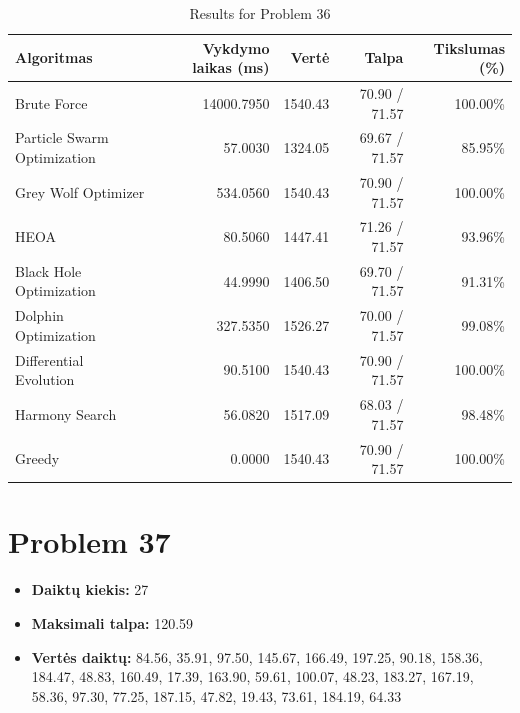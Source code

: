 \documentclass[a4paper,11pt]{article}
\begin{document}
\begin{table}[h!]
\centering
\begin{tabular}{lrrrr}
\toprule
\textbf{Algoritmas} & \textbf{Vykdymo laikas (ms)} & \textbf{Vertė} & \textbf{Talpa} & \textbf{Tikslumas (\%)} \\
\midrule
Brute Force & 14000.7950 & 1540.43 & 70.90 / 71.57 & 100.00\% \\
Particle Swarm Optimization & 57.0030 & 1324.05 & 69.67 / 71.57 & 85.95\% \\
Grey Wolf Optimizer & 534.0560 & 1540.43 & 70.90 / 71.57 & 100.00\% \\
HEOA & 80.5060 & 1447.41 & 71.26 / 71.57 & 93.96\% \\
Black Hole Optimization & 44.9990 & 1406.50 & 69.70 / 71.57 & 91.31\% \\
Dolphin Optimization & 327.5350 & 1526.27 & 70.00 / 71.57 & 99.08\% \\
Differential Evolution & 90.5100 & 1540.43 & 70.90 / 71.57 & 100.00\% \\
Harmony Search & 56.0820 & 1517.09 & 68.03 / 71.57 & 98.48\% \\
Greedy & 0.0000 & 1540.43 & 70.90 / 71.57 & 100.00\% \\
\bottomrule
\end{tabular}
\caption{Results for Problem 36}
\end{table}
\clearpage

\section*{Problem 37}
\begin{itemize}
    \item \textbf{Daiktų kiekis:} 27
    \item \textbf{Maksimali talpa:} 120.59
    \item \textbf{Vertės daiktų:} 84.56, 35.91, 97.50, 145.67, 166.49, 197.25, 90.18, 158.36, 184.47, 48.83, 160.49, 17.39, 163.90, 59.61, 100.07, 48.23, 183.27, 167.19, 58.36, 97.30, 77.25, 187.15, 47.82, 19.43, 73.61, 184.19, 64.33
\end{itemize}
\end{document}
